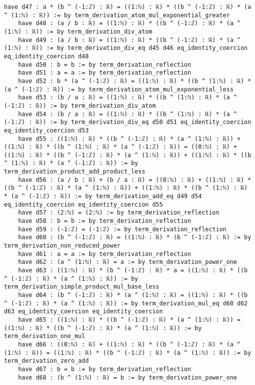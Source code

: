\documentclass{article}
\begin{document}
\begin{tcolorbox}[colback=white!10, width=\linewidth]
\begin{lstlisting}[language=Lean4]
    have d47 : a * (b ^ (-1:ℤ) : ℝ) = ((1:ℕ) : ℝ) * ((b ^ (-1:ℤ) : ℝ) * (a ^ (1:ℕ) : ℝ)) := by term_derivation_atom_mul_exponential_greater
    have d48 : (a / b : ℝ) = ((1:ℕ) : ℝ) * ((b ^ (-1:ℤ) : ℝ) * (a ^ (1:ℕ) : ℝ)) := by term_derivation_div_atom
    have d49 : (a / b : ℝ) = ((1:ℕ) : ℝ) * ((b ^ (-1:ℤ) : ℝ) * (a ^ (1:ℕ) : ℝ)) := by term_derivation_div_eq d45 d46 eq_identity_coercion eq_identity_coercion d48
    have d50 : b = b := by term_derivation_reflection
    have d51 : a = a := by term_derivation_reflection
    have d52 : b * (a ^ (-1:ℤ) : ℝ) = ((1:ℕ) : ℝ) * ((b ^ (1:ℕ) : ℝ) * (a ^ (-1:ℤ) : ℝ)) := by term_derivation_atom_mul_exponential_less
    have d53 : (b / a : ℝ) = ((1:ℕ) : ℝ) * ((b ^ (1:ℕ) : ℝ) * (a ^ (-1:ℤ) : ℝ)) := by term_derivation_div_atom
    have d54 : (b / a : ℝ) = ((1:ℕ) : ℝ) * ((b ^ (1:ℕ) : ℝ) * (a ^ (-1:ℤ) : ℝ)) := by term_derivation_div_eq d50 d51 eq_identity_coercion eq_identity_coercion d53
    have d55 : ((1:ℕ) : ℝ) * ((b ^ (-1:ℤ) : ℝ) * (a ^ (1:ℕ) : ℝ)) + ((1:ℕ) : ℝ) * ((b ^ (1:ℕ) : ℝ) * (a ^ (-1:ℤ) : ℝ)) = ((0:ℕ) : ℝ) + ((1:ℕ) : ℝ) * ((b ^ (-1:ℤ) : ℝ) * (a ^ (1:ℕ) : ℝ)) + ((1:ℕ) : ℝ) * ((b ^ (1:ℕ) : ℝ) * (a ^ (-1:ℤ) : ℝ)) := by term_derivation_product_add_product_less
    have d56 : (a / b : ℝ) + (b / a : ℝ) = ((0:ℕ) : ℝ) + ((1:ℕ) : ℝ) * ((b ^ (-1:ℤ) : ℝ) * (a ^ (1:ℕ) : ℝ)) + ((1:ℕ) : ℝ) * ((b ^ (1:ℕ) : ℝ) * (a ^ (-1:ℤ) : ℝ)) := by term_derivation_add_eq d49 d54 eq_identity_coercion eq_identity_coercion d55
    have d57 : (2:ℕ) = (2:ℕ) := by term_derivation_reflection
    have d58 : b = b := by term_derivation_reflection
    have d59 : (-1:ℤ) = (-1:ℤ) := by term_derivation_reflection
    have d60 : (b ^ (-1:ℤ) : ℝ) = ((1:ℕ) : ℝ) * (b ^ (-1:ℤ) : ℝ) := by term_derivation_non_reduced_power
    have d61 : a = a := by term_derivation_reflection
    have d62 : (a ^ (1:ℕ) : ℝ) = a := by term_derivation_power_one
    have d63 : ((1:ℕ) : ℝ) * (b ^ (-1:ℤ) : ℝ) * a = ((1:ℕ) : ℝ) * ((b ^ (-1:ℤ) : ℝ) * (a ^ (1:ℕ) : ℝ)) := by term_derivation_simple_product_mul_base_less
    have d64 : (b ^ (-1:ℤ) : ℝ) * (a ^ (1:ℕ) : ℝ) = ((1:ℕ) : ℝ) * ((b ^ (-1:ℤ) : ℝ) * (a ^ (1:ℕ) : ℝ)) := by term_derivation_mul_eq d60 d62 d63 eq_identity_coercion eq_identity_coercion
    have d65 : ((1:ℕ) : ℝ) * ((b ^ (-1:ℤ) : ℝ) * (a ^ (1:ℕ) : ℝ)) = ((1:ℕ) : ℝ) * ((b ^ (-1:ℤ) : ℝ) * (a ^ (1:ℕ) : ℝ)) := by term_derivation_one_mul
    have d66 : ((0:ℕ) : ℝ) + ((1:ℕ) : ℝ) * ((b ^ (-1:ℤ) : ℝ) * (a ^ (1:ℕ) : ℝ)) = ((1:ℕ) : ℝ) * ((b ^ (-1:ℤ) : ℝ) * (a ^ (1:ℕ) : ℝ)) := by term_derivation_zero_add
    have d67 : b = b := by term_derivation_reflection
    have d68 : (b ^ (1:ℕ) : ℝ) = b := by term_derivation_power_one

\end{lstlisting}
\end{tcolorbox}
\end{document}
